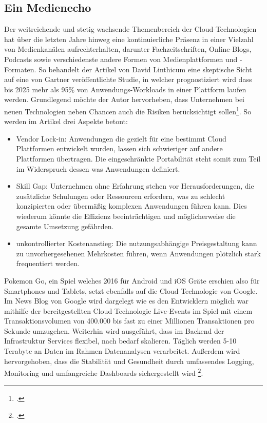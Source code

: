 \subsection{Ein Medienecho}\label{lab:medienecho}
Der weitreichende und stetig wachsende Themenbereich der Cloud-Technologien hat über die letzten Jahre hinweg eine kontinuierliche Präsenz in einer Vielzahl von Medienkanälen aufrechterhalten, darunter Fachzeitschriften, Online-Blogs, Podcasts sowie verschiedenste andere Formen von Medienplattformen und -Formaten. So behandelt der Artikel von David Linthicum eine skeptische Sicht auf eine von Gartner veröffentlichte Studie, in welcher prognostiziert wird dass bis 2025 mehr als 95\% von Anwendungs-Workloads in einer \cn Plattform laufen werden. Grundlegend möchte der Autor hervorheben, dass Unternehmen bei neuen Technologien neben Chancen auch die Risiken berücksichtigt sollen\footcite[Vgl.][o.S.]{compWoche}. So werden im Artikel drei Aspekte betont:
\begin{itemize}
	\item Vendor Lock-in: Anwendungen die gezielt für eine bestimmt Cloud Plattformen entwickelt wurden, lassen sich schwieriger auf andere Plattformen übertragen. Die eingeschränkte Portabilität steht somit zum Teil im Widerspruch dessen was \cn Anwendungen definiert.
	\item Skill Gap: Unternehmen ohne Erfahrung stehen vor Herausforderungen, die zusätzliche Schulungen oder Ressourcen erfordern, was zu schlecht konzipierten oder übermäßig komplexen Anwendungen führen kann. Dies wiederum könnte die Effizienz beeinträchtigen und möglicherweise die gesamte Umsetzung gefährden.
	\item unkontrollierter Kostenanstieg: Die nutzungsabhängige Preisgestaltung kann zu unvorhergesehenen Mehrkosten führen, wenn Anwendungen plötzlich stark frequentiert werden. 
\end{itemize}

Pokemon Go, ein Spiel welches 2016 für Android und iOS Gräte erschien also für Smartphones und Tablets, setzt ebenfalls auf die Cloud Technologie von Google. Im News Blog von Google wird dargelegt wie es den Entwicklern möglich war mithilfe der bereitgestellten Cloud Technologie Live-Events im Spiel mit einem Transaktionsvolumen von 400.000 bis fast zu einer Millionen Transaktionen pro Sekunde umzugehen. Weiterhin wird ausgeführt, dass im Backend der Infrastruktur  Services flexibel, nach bedarf skalieren. Täglich werden 5-10 Terabyte an Daten im Rahmen Datenanalysen verarbeitet. Außerdem wird hervorgehoben, dass die Stabilität und Gesundheit durch umfassendes Logging, Monitoring und umfangreiche Dashboards sichergestellt wird \footcite[Vgl.][o.S.]{pokemonGo}.
